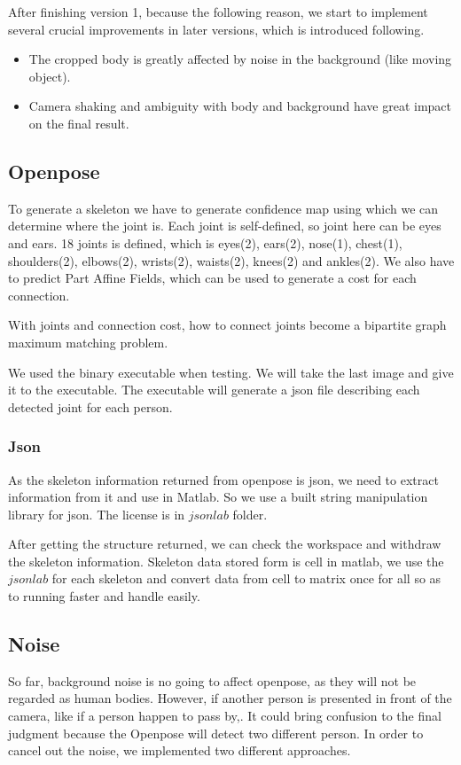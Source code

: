 \documentclass[11pt,twocolumn,letterpaper]{article}
\begin{document}
		\par
		After finishing version 1, because the following reason, we start to implement several crucial improvements in later versions, which is introduced following.
		\begin{itemize}
		\item The cropped body is greatly affected by noise in the background (like moving object).
		\item Camera shaking and ambiguity with body and background have great impact on the final result.
		\end{itemize}
	\subsection{Openpose\cite{cao2017realtime}}
	    \par To generate a skeleton we have to generate confidence map using which we can determine where the joint is.
		Each joint is self-defined, so joint here can be eyes and ears.
		18 joints is defined, which is eyes(2), ears(2), nose(1), chest(1), shoulders(2), elbows(2), wrists(2), waists(2), knees(2) and ankles(2).
		We also have to predict Part Affine Fields, which can be used to generate a cost for each connection.
		\par With joints and connection cost, how to connect joints become a bipartite graph maximum matching problem.
		\par We used the binary executable\cite{cao2017realtime} when testing. We will take the last image and give it to the executable. The executable will generate a json file describing each detected joint for each person.
	    \subsubsection{Json}
        \par As the skeleton information returned from openpose is json, we need to extract information from it and use in Matlab. So we use a built string manipulation library for json. The license is in $jsonlab$ folder.
        \par After getting the structure returned, we can check the workspace and withdraw the skeleton information. Skeleton data stored form is cell in matlab, we use the $jsonlab$ for each skeleton and convert data from cell to matrix once for all so as to running faster and handle easily.

	\subsection{Noise}
\par
So far, background noise is no going to affect openpose, as they will not be regarded as human bodies. However, if another person is presented in front of the camera, like if a person happen to pass by,. It could bring confusion to the final judgment because the Openpose will detect two different person. In order to cancel out the noise, we implemented two different approaches.
\end{document}
